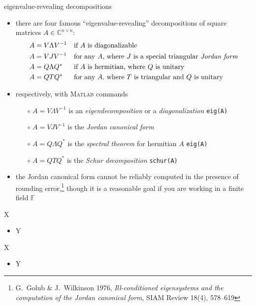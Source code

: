 \documentclass[10pt,hyperref]{beamer}
\newcommand{\CC}{\mathbb{C}}
\newcommand{\Matlab}{\textsc{Matlab}\xspace}
\begin{document}
\begin{frame}{eigenvalue-revealing decompositions}

\begin{itemize}  
\item there are four famous ``eigenvalue-revealing'' decompositions of square matrices $A\in\CC^{n\times n}$:
\begin{align*}
A &= V \Lambda V^{-1} & &\text{if $A$ is diagonalizable} \\
A &= V J V^{-1} & &\text{for any $A$, where $J$ is a special triangular \emph{Jordan form}} \\
A &= Q \Lambda Q^* & &\text{if $A$ is hermitian, where $Q$ is unitary} \\
A &= Q T Q^* & &\text{for any $A$, where $T$ is triangular and $Q$ is unitary}
\end{align*}
\item respectively, with \Matlab commands
    \begin{itemize}
    \item[$\circ$] $A = V \Lambda V^{-1}$ is an \emph{eigendecomposition} or a \emph{diagonalization} \hfill \texttt{eig(A)}
    \item[$\circ$] $A = V J V^{-1}$ is the \emph{Jordan canonical form}
    \item[$\circ$] $A = Q \Lambda Q^*$ is the \emph{spectral theorem} for hermitian $A$ \hfill \texttt{eig(A)}
    \item[$\circ$] $A = Q T Q^*$ is the \emph{Schur decomposition} \hfill \texttt{schur(A)}
    \end{itemize}
\item the Jordan canonical form cannot be reliably computed in the presence of rounding error,\footnote{G.~Golub \& J.~Wilkinson 1976, \emph{Ill-conditioned eigensystems and the computation of the Jordan canonical form}, SIAM Review 18(4), 578--619} though it is a reasonable goal if you are working in a finite field $\mathbb{F}$
\end{itemize}
\end{frame}


\begin{frame}{X}

\begin{itemize}
\item Y
\end{itemize}
\end{frame}


\begin{frame}{X}

\begin{itemize}
\item Y
\end{itemize}
\end{frame}
\end{document}
